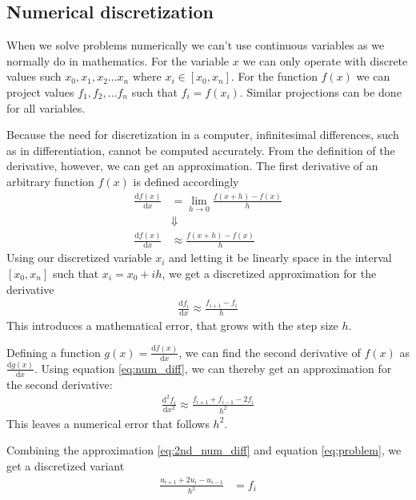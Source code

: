 \documentclass[english]{article}
\renewcommand{\d}{\mathrm{d}} %
\begin{document}
\subsection{Numerical discretization}
When we solve problems numerically we can't use continuous variables as we normally do in mathematics. For the variable $x$ we can only operate with discrete values such $x_0, x_1, x_2 ... x_n$ where $x_i \in [x_0, x_n]$. For the function $f(x)$ we can project values $f_1, f_2, ... f_n$ such that $f_i = f(x_i)$. Similar projections can be done for all variables.

Because the need for discretization in a computer, infinitesimal differences, such as in differentiation, cannot be computed accurately. From the definition of the derivative, however, we can get an approximation. The first derivative of an arbitrary function $f(x)$ is defined accordingly
\begin{align*}
    \frac{\d f(x)}{\d x} &= \lim_{h \to 0}\frac{f(x+h)-f(x)}{h} \\
    &\Downarrow \\
    \frac{\d f(x)}{\d x} &\approx \frac{f(x+h)-f(x)}{h}
\end{align*}
Using our discretized variable $x_i$ and letting it be linearly space in the interval $[x_0, x_n]$ such that $x_i = x_0 + ih$, we get a discretized approximation for the derivative
\begin{align} \label{eq:num_diff}
    \frac{\d f_i}{\d x} \approx \frac{f_{i+1}-f_i}{h}
\end{align}
This introduces a mathematical error, that grows with the step size $h$.

Defining a function $g(x) = \frac{\d f(x)}{\d x}$, we can find the second derivative of $f(x)$ as $\frac{\d g(x)}{\d x}$. Using equation \eqref{eq:num_diff}, we can thereby get an approximation for the second derivative:
\begin{align} \label{eq:2nd_num_diff}
    \frac{\d^2 f_i}{\d x^2} \approx \frac{f_{i+1}+f_{i-1}-2f_i}{h^2}
\end{align}
This leaves a numerical error that follows $h^2$.

Combining the approximation \eqref{eq:2nd_num_diff} and equation \eqref{eq:problem}, we get a discretized variant
\begin{align}
    \frac{u_{i+1}+2u_i-u_{i-1}}{h^2} &= f_i
\end{align}
\end{document}
